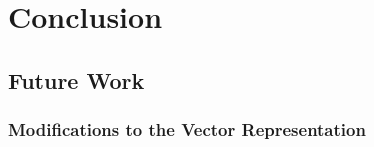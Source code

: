 \documentclass[thesis.tex]{subfiles}
\begin{document}
\chapter{Conclusion}
\label{chap:conclusion}


\section{Future Work}

\subsection{Modifications to the Vector Representation}

\end{document}
